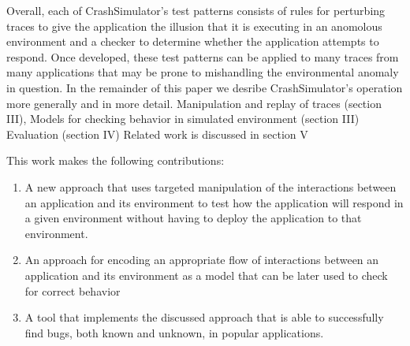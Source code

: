 Overall, each of CrashSimulator's test patterns consists of rules for perturbing traces to give the application the
illusion that it is executing in an anomolous environment and a checker to determine whether the application attempts to
respond.  Once developed, these test patterns can be applied to many traces from many applications that may be prone to mishandling the environmental anomaly in question.
In the remainder of this paper we desribe CrashSimulator's operation more generally and in more detail.
Manipulation and replay of traces (section III),
Models for checking behavior in simulated environment (section III)
Evaluation (section IV)
Related work is discussed in section V

		This work makes the following contributions:

    \begin{enumerate}
        \item{A new approach that uses targeted manipulation of the interactions between an application and its
            environment to test how the application will respond in a given environment without having to deploy
            the application to that environment.}
        \item{An approach for encoding an appropriate flow of interactions between an application and its environment as
            a model that can be later used to check for correct behavior}
        \item{A tool that implements the discussed approach that is able to successfully find bugs, both known and
            unknown, in popular applications.}
    \end{enumerate}


